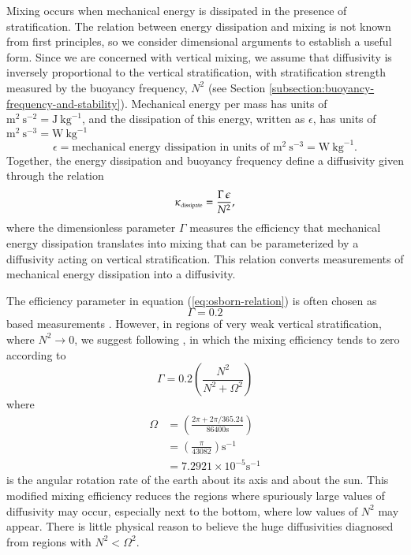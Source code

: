 Mixing occurs when mechanical energy is dissipated in the presence of
stratification.  The relation between energy dissipation and mixing is
not known from first principles, so we consider dimensional arguments
to establish a useful form.  Since we are concerned with vertical
mixing, we assume that diffusivity is inversely proportional to the
vertical stratification, with stratification strength measured by the
buoyancy frequency, $N^{2}$ (see Section
\ref{subsection:buoyancy-frequency-and-stability}).  Mechanical energy
per mass has units of $\mbox{m}^{2}~\mbox{s}^{-2} =
\mbox{J}~\mbox{kg}^{-1}$, and the dissipation of this energy, written
as $\epsilon$, has units of $\mbox{m}^{2}~\mbox{s}^{-3} =
\mbox{W}~\mbox{kg}^{-1}$
\begin{equation}
\epsilon = \mbox{mechanical energy dissipation in units of
 $\mbox{m}^{2}~\mbox{s}^{-3} = \mbox{W}~\mbox{kg}^{-1}$.}
\label{eq:energy-dissipation-epsilon}
\end{equation}
Together, the energy dissipation and buoyancy frequency define a
diffusivity given through the relation \citep{Osborn1980}
\begin{equation}
  \kappa_{\mbox{\tiny dissipate}} = \frac{\Gamma \, \epsilon}{N^{2}},
\label{eq:osborn-relation}
\end{equation} 
where the dimensionless parameter $\Gamma$ measures the efficiency
that mechanical energy dissipation translates into mixing that can be
parameterized by a diffusivity acting on vertical stratification.
This relation converts measurements of mechanical energy dissipation
into a diffusivity.

The efficiency parameter in equation (\ref{eq:osborn-relation}) is
often chosen as
\begin{equation}
  \Gamma = 0.2
\end{equation}
based measurements \citep{Osborn1980,Ivey_Imberger1991}.  However, in
regions of very weak vertical stratification, where $N^{2} \rightarrow
0$, we suggest following \cite{Melet_etal_2013}, in which the mixing
efficiency tends to zero according to
\begin{equation}
  \Gamma = 0.2 \left( \frac{N^{2}}{N^{2} + \Omega^{2}} \right)
\label{eq:gamma-stratification-dependent}
\end{equation} 
 where 
\begin{equation}
\begin{split}
 \Omega &=  \left(\frac{2\pi + 2\pi/365.24}{86400 \mbox{s}} \right)
 \\
 &=
 \left( \frac{\pi}{43082} \right) \mbox{s}^{-1} 
 \\
 &=
 7.2921 \times 10^{-5} \mbox{s}^{-1}
\end{split}
\label{eq:Omega-defined}
\end{equation}
is the angular rotation rate of the earth about its axis and about the
sun.  This modified mixing efficiency reduces the regions where
spuriously large values of diffusivity may occur, especially next to
the bottom, where low values of $N^{2}$ may appear.  There is little
physical reason to believe the huge diffusivities diagnosed from
regions with $N^{2} < \Omega^{2}$.


